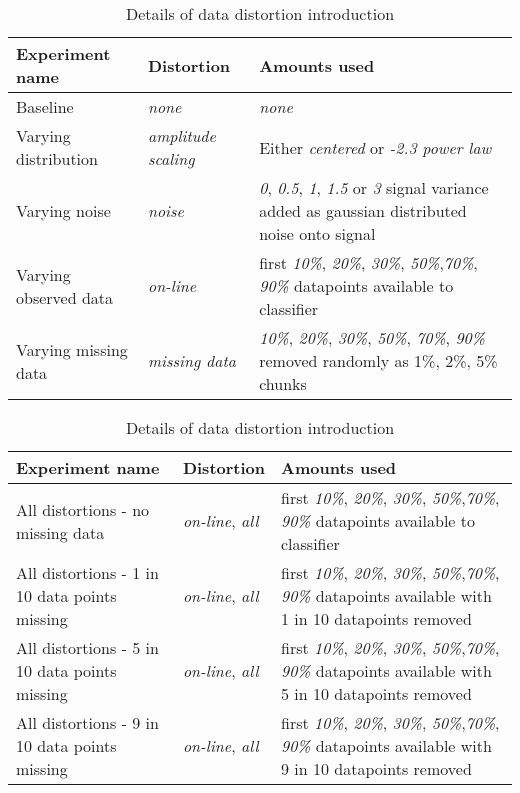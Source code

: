 	\begin{table}[ht!]
		\label{tab:experiments}
		\centering
		\begin{tabular}{|p{}|l|p{}|} \hline
			\textbf{Experiment name} & \textbf{Distortion} & \textbf{Amounts used} \\ \hline
			Baseline & \emph{none} & \emph{none} \\
			Varying distribution & \emph{amplitude scaling} & Either \emph{centered} or \emph{-2.3 power law} \\
			Varying noise & \emph{noise} & \emph{0}, \emph{0.5}, \emph{1}, \emph{1.5} or \emph{3} signal variance added as gaussian distributed noise onto signal\\
			Varying observed data & \emph{on-line} & first \emph{10\%}, \emph{20\%}, \emph{30\%}, \emph{50\%},\emph{70\%}, \emph{90\%} datapoints available to classifier \\
			Varying missing data & \emph{missing data} & \emph{10\%}, \emph{20\%}, \emph{30\%}, \emph{50\%}, \emph{70\%}, \emph{90\%} removed randomly as 1\%, 2\%, 5\% chunks \\ \hline
		\end{tabular}
		\caption{Details of data distortion introduction}
	\end{table}
	
		\begin{table}[ht!]
		\label{tab:experiments}
		\centering
		\begin{tabular}{|p{}|l|p{}|} \hline
			\textbf{Experiment name} & \textbf{Distortion} & \textbf{Amounts used} \\ \hline
			All distortions - no missing data & \emph{on-line}, \emph{all} & first \emph{10\%}, \emph{20\%}, \emph{30\%}, \emph{50\%},\emph{70\%}, \emph{90\%} datapoints available to classifier \\ \hline
			All distortions - 1 in 10 data points missing & \emph{on-line}, \emph{all} & first \emph{10\%}, \emph{20\%}, \emph{30\%}, \emph{50\%},\emph{70\%}, \emph{90\%} datapoints available with 1 in 10 datapoints removed \\ \hline
			All distortions - 5 in 10 data points missing & \emph{on-line}, \emph{all} & first \emph{10\%}, \emph{20\%}, \emph{30\%}, \emph{50\%},\emph{70\%}, \emph{90\%} datapoints available with 5 in 10 datapoints removed \\ \hline
			All distortions - 9 in 10 data points missing & \emph{on-line}, \emph{all} & first \emph{10\%}, \emph{20\%}, \emph{30\%}, \emph{50\%},\emph{70\%}, \emph{90\%} datapoints available with 9 in 10 datapoints removed \\ \hline
		\end{tabular}
		\caption{Details of data distortion introduction}
	\end{table}
	
